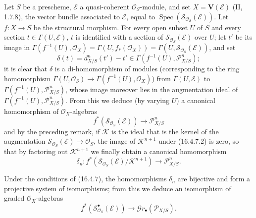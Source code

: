 \begin{env}[16.4.7]
\label{IV.16.4.7}
Let $S$ be a prescheme, $\mathscr{E}$ a quasi-coherent $\mathcal{O}_S$-module,
and set $X=\mathbf{V}(\mathscr{E})$ (II, 1.7.8), the vector bundle
associated to $\mathscr{E}$, equal to
$\operatorname{Spec}(\mathscr{S}_{\mathcal{O}_S}(\mathscr{E}))$. Let
$f:X\to S$ be the structural morphism. For every open subset $U$ of $S$ and every
section $t\in\Gamma(U,\mathscr{E})$, $t$ is identified with a section of
$\mathscr{S}_{\mathcal{O}_S}(\mathscr{E})$ over $U$; let $t'$ be its
image in
$\Gamma(f^{-1}(U),\mathcal{O}_X)=\Gamma(U,f_*(\mathcal{O}_X))=
\Gamma(U,\mathscr{S}_{\mathcal{O}_S}(\mathscr{E}))$, and set
\[
  \delta(t)=d_{X/S}^n(t')-t'\in
  \Gamma(f^{-1}(U),\mathscr{P}_{X/S}^n);
  \tag{16.4.7.1}
  \label{IV.16.4.7.1}
\]
it is clear that $\delta$ is a di-homomorphism of modules (corresponding to
the ring homomorphism
$\Gamma(U,\mathcal{O}_S)\to\Gamma(f^{-1}(U),\mathcal{O}_X)$) from
$\Gamma(U,\mathscr{E})$ to $\Gamma(f^{-1}(U),\mathscr{P}_{X/S}^n)$, whose
image moreover lies in the augmentation ideal of
$\Gamma(f^{-1}(U),\mathscr{P}_{X/S}^n)$. From this we deduce (by varying $U$)
a canonical homomorphism of $\mathcal{O}_X$-algebras
\[
  f^*(\mathscr{S}_{\mathcal{O}_S}(\mathscr{E}))
  \longrightarrow\mathscr{P}_{X/S}^n
  \tag{16.4.7.2}
  \label{IV.16.4.7.2}
\]
and by the preceding remark, if $\mathscr{K}$ is the ideal that is the kernel of
the augmentation $\mathscr{S}_{\mathcal{O}_S}(\mathscr{E})\to\mathcal{O}_S$,
the image of $\mathscr{K}^{n+1}$ under (16.4.7.2) is zero, so that by
factoring out $\mathscr{K}^{n+1}$ we finally obtain a canonical homomorphism
\[
  \delta_n:f^*(\mathscr{S}_{\mathcal{O}_S}(\mathscr{E})/
  \mathscr{K}^{n+1})\longrightarrow\mathscr{P}_{X/S}^n.
  \tag{16.4.7.3}
  \label{IV.16.4.7.3}
\]
\end{env}

\begin{proposition}[16.4.8]
\label{IV.16.4.8}
Under the conditions of (16.4.7), the homomorphisms $\delta_n$ are bijective and
form a projective system of isomorphisms; from this we deduce an isomorphism of
graded $\mathcal{O}_X$-algebras
\[
  f^*(\mathscr{S}_{\mathcal{O}_S}^{\bullet}(\mathscr{E}))
  \longrightarrow\mathscr{G}r_\bullet(\mathscr{P}_{X/S}).
  \tag{16.4.8.1}
  \label{IV.16.4.8.1}
\]
\end{proposition}

